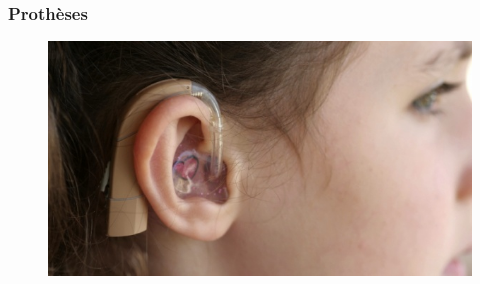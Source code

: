 \documentclass{article}
\begin{document}
\subsubsection{Prothèses}
\begin{figure}[h!]
\centering
\includegraphics[scale=0.4]{./images/prothese-auditive-impression3d.png}
\end{figure}\hfill
\end{document}
